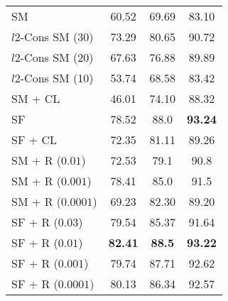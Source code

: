\documentclass[10pt,twocolumn,letterpaper]{article}
\begin{document}
\begin{table}
\begin{tabular}{l c c c}








SM    &    60.52   &  69.69     & 83.10   \\ 

$l2$-Cons SM (30)  \cite{ranjan2017l2}&  73.29   & 80.65   &   90.72   \\ 
$l2$-Cons SM (20)  \cite{ranjan2017l2}&   67.63  &   76.88    & 89.89     \\ 
$l2$-Cons SM (10)  \cite{ranjan2017l2}&  53.74   & 68.58    &  83.42    \\ 
SM + CL \cite{wen2016discriminative} &  46.01  & 74.10  &   88.32  \\ 
SF   \cite{liu2017sphereface}& 78.52    &  88.0   &  \textbf{93.24}  \\
SF + CL \cite{wen2016discriminative, liu2017sphereface}  & 72.35   & 81.11  &  89.26 \\
\hline

SM + R ($0.01$) & 72.53  &  79.1  & 90.8     \\ 
SM + R ($0.001$) &   78.41  &  85.0  &  91.5      \\ 
SM + R  ($0.0001$)  &  69.23  &  82.30   &  89.20    \\ 

\hline
SF + R  ($0.03$) & 79.54   &    85.37  &  91.64    \\ 
SF + R  ($0.01$) &   \textbf{82.41}   & \textbf{ 88.5} & \textbf{93.22}     \\ 

SF + R  ($0.001$) & 79.74    &     87.71 &  92.62    \\
SF + R  ($0.0001$) &    80.13 &     86.34    & 92.57    \\




\end{tabular}
\end{table}
\end{document}
